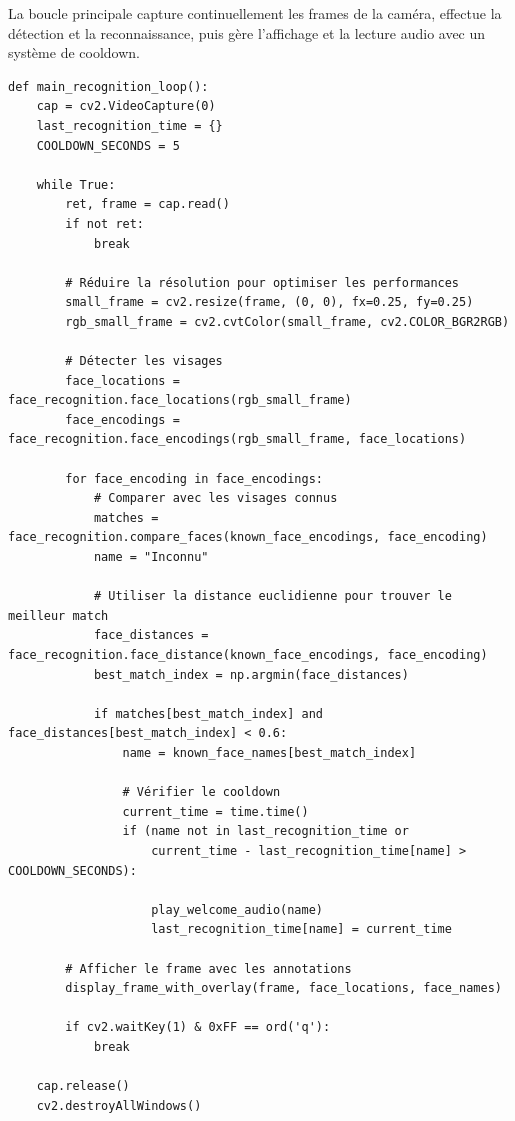 \documentclass[12pt,a4paper]{article}
\begin{document}
La boucle principale capture continuellement les frames de la caméra, effectue la détection et la reconnaissance, puis gère l'affichage et la lecture audio avec un système de cooldown.

\begin{lstlisting}[caption=Boucle principale de reconnaissance]
def main_recognition_loop():
    cap = cv2.VideoCapture(0)
    last_recognition_time = {}
    COOLDOWN_SECONDS = 5
    
    while True:
        ret, frame = cap.read()
        if not ret:
            break
        
        # Réduire la résolution pour optimiser les performances
        small_frame = cv2.resize(frame, (0, 0), fx=0.25, fy=0.25)
        rgb_small_frame = cv2.cvtColor(small_frame, cv2.COLOR_BGR2RGB)
        
        # Détecter les visages
        face_locations = face_recognition.face_locations(rgb_small_frame)
        face_encodings = face_recognition.face_encodings(rgb_small_frame, face_locations)
        
        for face_encoding in face_encodings:
            # Comparer avec les visages connus
            matches = face_recognition.compare_faces(known_face_encodings, face_encoding)
            name = "Inconnu"
            
            # Utiliser la distance euclidienne pour trouver le meilleur match
            face_distances = face_recognition.face_distance(known_face_encodings, face_encoding)
            best_match_index = np.argmin(face_distances)
            
            if matches[best_match_index] and face_distances[best_match_index] < 0.6:
                name = known_face_names[best_match_index]
                
                # Vérifier le cooldown
                current_time = time.time()
                if (name not in last_recognition_time or 
                    current_time - last_recognition_time[name] > COOLDOWN_SECONDS):
                    
                    play_welcome_audio(name)
                    last_recognition_time[name] = current_time
        
        # Afficher le frame avec les annotations
        display_frame_with_overlay(frame, face_locations, face_names)
        
        if cv2.waitKey(1) & 0xFF == ord('q'):
            break
    
    cap.release()
    cv2.destroyAllWindows()
\end{lstlisting}
\end{document}
